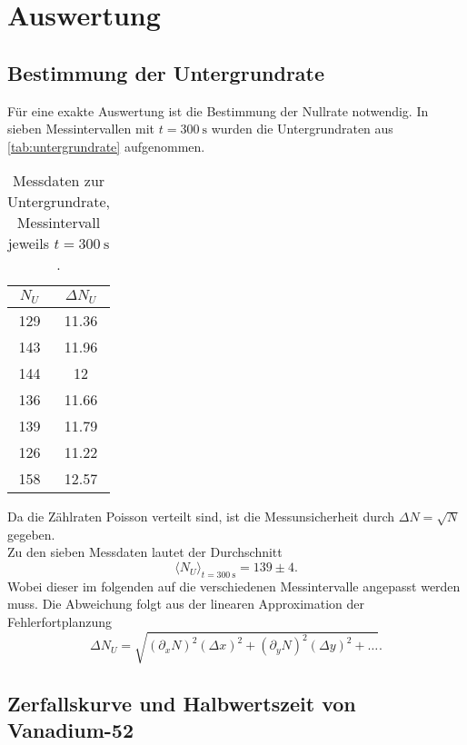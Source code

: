 \section{Auswertung}
\label{sec:Auswertung}

\subsection{Bestimmung der Untergrundrate}
\label{sec:aus:untergrundrate}

Für eine exakte Auswertung ist die Bestimmung der Nullrate notwendig.
In sieben Messintervallen mit $t = \SI{300}{\second}$ wurden die 
Untergrundraten aus \autoref{tab:untergrundrate} aufgenommen.
\begin{table}
	\centering
	\caption{Messdaten zur Untergrundrate, Messintervall jeweils $t = \SI{300}{\second}$.}
	\label{tab:untergrundrate}
	\begin{tabular}{c c}
		\toprule
		$N_U$ & $\Delta N_U$ \\
		\midrule
		129 & 11.36 \\
		143 & 11.96 \\
		144 & 12 \\
		136 & 11.66 \\
		139 & 11.79 \\
		126 & 11.22 \\
		158 & 12.57 \\
		\bottomrule
	\end{tabular}
\end{table}

\noindent
Da die Zählraten Poisson verteilt sind, ist die Messunsicherheit durch $\Delta N = \sqrt{N}$ 
gegeben.
\\
Zu den sieben Messdaten lautet der Durchschnitt
\begin{equation}
	\langle N_U \rangle_{t = \SI{300}{\second}} = 139 \pm 4.
\end{equation}
Wobei dieser im folgenden auf die verschiedenen Messintervalle angepasst werden muss.
\noindent
Die Abweichung folgt aus der linearen Approximation der Fehlerfortplanzung
\begin{equation}
	\Delta N_U = \sqrt{(\partial_x N)^2 (\Delta x)^2 + (\partial_y N)^2 (\Delta y)^2 + \hdots}.
	\label{eqn:fehlerfortpflanzung}
\end{equation}

\subsection{Zerfallskurve und Halbwertszeit von Vanadium-52}
\label{sec:aus:vanadium}

